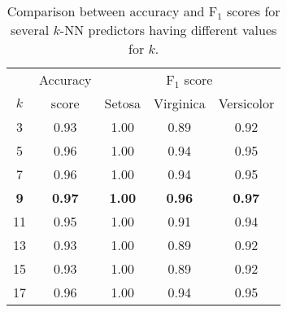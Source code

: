 
\begin{table}
	\caption{Comparison between accuracy and F$_1$ scores for several $k$-NN predictors having different values for $k$.}
	\begin{tabular}{c|c|ccc}
		\toprule
		& Accuracy & \multicolumn{3}{c}{F$_1$ score}\\
 		$k$ & score & Setosa & Virginica & Versicolor \\
		\midrule
		3 & 0.93 & 1.00 & 0.89 & 0.92 \\
		5 & 0.96 & 1.00 & 0.94 & 0.95 \\
		7 & 0.96 & 1.00 & 0.94 & 0.95 \\
		\textbf{9} & \textbf{0.97} & \textbf{1.00} & \textbf{0.96} & \textbf{0.97} \\
		11 & 0.95 & 1.00 & 0.91 & 0.94 \\
		13 & 0.93 & 1.00 & 0.89 & 0.92 \\
		15 & 0.93 & 1.00 & 0.89 & 0.92 \\
		17 & 0.96 & 1.00 & 0.94 & 0.95 \\
		\bottomrule
	\end{tabular}
\end{table}